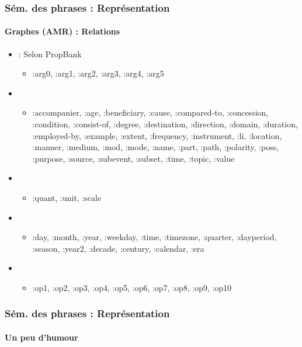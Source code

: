 \documentclass[xcolor=table]{beamer}
\begin{document}
\begin{frame}[fragile]
	\frametitle{Sém. des phrases : Représentation}
	\framesubtitle{Graphes (AMR) : Relations}
	
	\begin{itemize}
		\item {} : Selon PropBank
		\begin{itemize}
			\item :arg0, :arg1, :arg2, :arg3, :arg4, :arg5
		\end{itemize}
		\item {}
		\begin{itemize}
			\item :accompanier, :age, :beneficiary, :cause, :compared-to, :concession, :condition, :consist-of, :degree, :destination, :direction, :domain, :duration, :employed-by, :example, :extent, :frequency, :instrument, :li, :location, :manner, :medium, :mod, :mode, :name, :part, :path, :polarity, :poss, :purpose, :source, :subevent, :subset, :time, :topic, :value
		\end{itemize}
		\item {}
		\begin{itemize}
			\item :quant, :unit, :scale
		\end{itemize}
		\item {}
		\begin{itemize}
			\item :day, :month,
			:year, :weekday, :time, :timezone, :quarter,
			:dayperiod, :season, :year2, :decade, :century,
			:calendar, :era
		\end{itemize}
		\item {}
		\begin{itemize}
			\item :op1, :op2, :op3, :op4, :op5,
			:op6, :op7, :op8, :op9, :op10
		\end{itemize}
	\end{itemize}
	
\end{frame}

\begin{frame}
	\frametitle{Sém. des phrases : Représentation}
	\framesubtitle{Un peu d'humour}
	
	\begin{center}
	\end{center}
	
\end{frame}

\end{document}
